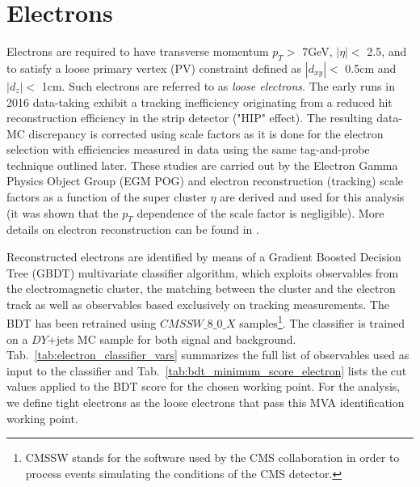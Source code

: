 \section{Electrons}
Electrons are required to have transverse momentum $p_{T}>$ 7GeV, $|\eta|<$ 2.5, and to satisfy a loose primary vertex (PV) constraint defined as $|d_{xy}|<$ 0.5cm and $|d_{z}|<$ 1cm. Such electrons are referred to as \textit{loose electrons}. The early runs in 2016 data-taking exhibit a tracking inefficiency originating from a reduced hit reconstruction efficiency in the strip detector ("HIP" effect). The resulting data-MC discrepancy is corrected using scale factors as it is done for the electron selection with efficiencies measured in data using the same tag-and-probe technique outlined later. These studies are carried out by the Electron Gamma Physics Object Group (EGM POG) and electron reconstruction (tracking) scale factors as a function of the super cluster $\eta$ are derived and used for this analysis (it was shown that the $p_{T}$ dependence of the scale factor is negligible). More details on electron reconstruction can be found in \cite{bib:JINST-10-2015-P06005}.

Reconstructed electrons are identified by means of a Gradient Boosted Decision Tree (GBDT) multivariate classifier algorithm, which exploits observables from the electromagnetic cluster, the matching between the cluster and the electron track as well as observables based exclusively on tracking measurements. The BDT has been retrained using $CMSSW\_8\_0\_X$ samples\footnote{CMSSW stands for the software used by the CMS collaboration in order to process events simulating the conditions of the CMS detector.}. The classifier is trained on a $DY$+jets MC sample for both signal and background. Tab.~\ref{tab:electron_classifier_vars} summarizes the full list of observables used as input to the classifier and Tab.~\ref{tab:bdt_minimum_score_electron} lists the cut values applied to the BDT score for the chosen working point. For the analysis, we define tight electrons as the loose electrons that pass this MVA identification working point.

